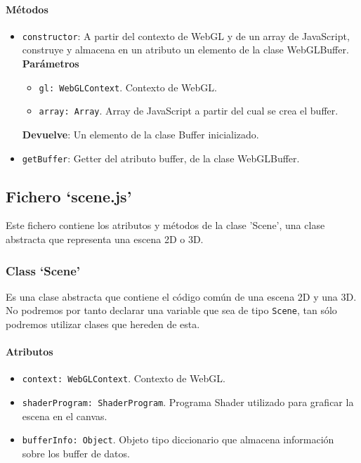 \paragraph*{Métodos}
\begin{itemize}
    \item \verb|constructor|: A partir del contexto de WebGL y de un array de JavaScript, construye y almacena en un atributo un elemento de la clase WebGLBuffer.
    \textbf{Parámetros}
    \begin{itemize}
        \item \verb|gl: WebGLContext|. Contexto de WebGL.
        \item \verb|array: Array|. Array de JavaScript a partir del cual se crea el buffer.
    \end{itemize}
    \textbf{Devuelve}: Un elemento de la clase Buffer inicializado.
    
    \item \verb|getBuffer|: Getter del atributo buffer, de la clase WebGLBuffer.
\end{itemize}

\subsection{Fichero `scene.js'}

Este fichero contiene los atributos y métodos de la clase 'Scene', una clase abstracta que representa una escena 2D o 3D.

\subsubsection{Class `Scene'}
Es una clase abstracta que contiene el código común de una escena 2D y una 3D. No podremos por tanto declarar una variable que sea de tipo \verb|Scene|, tan sólo podremos utilizar clases que hereden de esta.

\paragraph*{Atributos}
\begin{itemize}
    \item \verb|context: WebGLContext|. Contexto de WebGL.
    \item \verb|shaderProgram: ShaderProgram|. Programa Shader utilizado para graficar la escena en el canvas.
    \item \verb|bufferInfo: Object|. Objeto tipo diccionario que almacena información sobre los buffer de datos.
\end{itemize}
